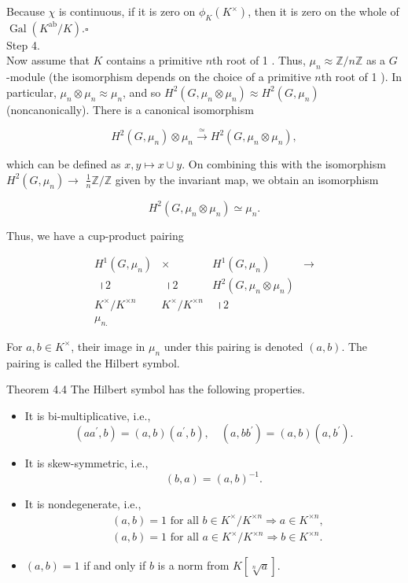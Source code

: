 \documentclass[10pt]{article}
\begin{document}
Because $\chi$ is continuous, if it is zero on $\phi_{K}\left(K^{\times}\right)$, then it is zero on the whole of $\operatorname{Gal}\left(K^{\mathrm{ab}} / K\right) . \square$\\
Step 4.\\
Now assume that $K$ contains a primitive $n$th root of 1 . Thus, $\mu_{n} \approx \mathbb{Z} / n \mathbb{Z}$ as a $G$ -module (the isomorphism depends on the choice of a primitive $n$th root of 1 ). In particular, $\mu_{n} \otimes \mu_{n} \approx \mu_{n}$, and so $H^{2}\left(G, \mu_{n} \otimes \mu_{n}\right) \approx H^{2}\left(G, \mu_{n}\right)$ (noncanonically). There is a canonical isomorphism

$$
H^{2}\left(G, \mu_{n}\right) \otimes \mu_{n} \xrightarrow{\simeq} H^{2}\left(G, \mu_{n} \otimes \mu_{n}\right),
$$

which can be defined as $x, y \mapsto x \cup y$. On combining this with the isomorphism $H^{2}\left(G, \mu_{n}\right) \rightarrow$ $\frac{1}{n} \mathbb{Z} / \mathbb{Z}$ given by the invariant map, we obtain an isomorphism

$$
H^{2}\left(G, \mu_{n} \otimes \mu_{n}\right) \simeq \mu_{n} .
$$

Thus, we have a cup-product pairing

$$
\begin{array}{cccc}
H^{1}\left(G, \mu_{n}\right) & \times & H^{1}\left(G, \mu_{n}\right) & \rightarrow \\
\text { ।2 } & \text { ।2 } & H^{2}\left(G, \mu_{n} \otimes \mu_{n}\right) \\
K^{\times} / K^{\times n} & K^{\times} / K^{\times n} & \text { ।2 } \\
\mu_{n .}
\end{array}
$$

For $a, b \in K^{\times}$, their image in $\mu_{n}$ under this pairing is denoted $(a, b)$. The pairing is called the Hilbert symbol.

Theorem 4.4 The Hilbert symbol has the following properties.

\begin{itemize}
  \item[(a)] It is bi-multiplicative, i.e.,
$$
\left(a a^{\prime}, b\right)=(a, b)\left(a^{\prime}, b\right), \quad\left(a, b b^{\prime}\right)=(a, b)\left(a, b^{\prime}\right) .
$$
  \item[(b)] It is skew-symmetric, i.e.,
$$
(b, a)=(a, b)^{-1} .
$$
  \item[(c)] It is nondegenerate, i.e.,
$$
\begin{aligned}
& (a, b)=1 \text { for all } b \in K^{\times} / K^{\times n} \Longrightarrow a \in K^{\times n}, \\
& (a, b)=1 \text { for all } a \in K^{\times} / K^{\times n} \Longrightarrow b \in K^{\times n} .
\end{aligned}
$$
  \item[(d)] $(a, b)=1$ if and only if $b$ is a norm from $K[\sqrt[n]{a}]$.
\end{itemize}
\end{document}
